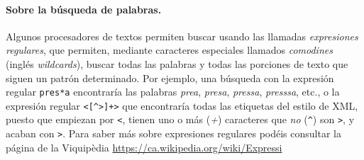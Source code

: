 \paragraph{Sobre la búsqueda de palabras.} Algunos procesadores de textos permiten buscar usando las llamadas \emph{expresiones regulares}, que permiten, mediante caracteres especiales llamados \emph{comodines} (inglés \emph{wildcards}), buscar todas las palabras y todas las porciones de texto que siguen un patrón determinado. Por ejemplo, una búsqueda con la expresión regular \texttt{pres*a} encontraría las palabras \emph{prea}, \emph{presa}, \emph{pressa}, \emph{presssa}, etc., o la expresión regular \texttt{<[\^{}>]+>} que encontraría todas las etiquetas del estilo de XML, puesto que empiezan por \texttt{<}, tienen uno o más (\emph{+}) caracteres que \emph{no} (\texttt{\^}) son \texttt{>}, y acaban con \texttt{>}. Para saber más sobre expresiones regulares podéis consultar la página de la Viquipèdia \url{https://ca.wikipedia.org/wiki/Expressi 

}
